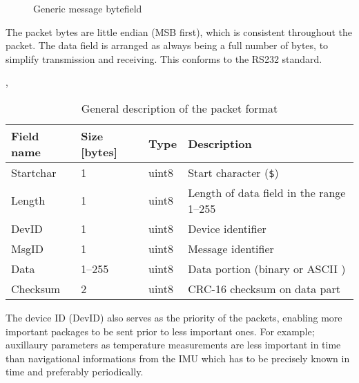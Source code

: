 \begin{figure}[h]
\centering
{}
\caption{Generic message bytefield}
\label{fig:bytefield}
\end{figure}


The packet bytes are little endian (MSB first), which is consistent throughout the packet. The data field is arranged as always being a full number of bytes, to simplify transmission and receiving. This conforms to the RS232 standard.

\begin{table}[htbp],
	\centering
	\begin{tabular}{llll}
		\toprule
		\textbf{Field name} & \textbf{Size [bytes]} & \textbf{Type} & \textbf{Description}\\
		\midrule
		Startchar & 1 & uint8 & Start character (\texttt{\$}) \\
		Length & 1 & uint8 & Length of data field in the range 1--255\\
		DevID & 1 & uint8 & Device identifier \\
		MsgID & 1 & uint8 & Message identifier \\
		Data & 1--255 & uint8 & Data portion (binary or ASCII )\\
		Checksum & 2 & uint8 & CRC-16 checksum on data part \\

		\bottomrule
	\end{tabular}
	\caption{General description of the packet format}
	\label{tab:general}
\end{table}

The device ID (DevID) also serves as the priority of the packets, enabling more important packages to be sent prior to less important ones. For example; auxillaury parameters as temperature measurements are less important in time than navigational informations from the \ac{IMU} which has to be precisely known in time and preferably periodically.


